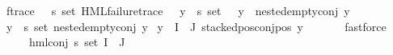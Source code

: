 \begin{isabellebody}
\ f{\isacharunderscore}{\kern0pt}trace{\isacharcolon}{\kern0pt}\ {\isachardoublequoteopen}{\isacharparenleft}{\kern0pt}{\isacharparenleft}{\kern0pt}{\isasymexists}{\isasympsi}{\isasymin}{\isacharparenleft}{\kern0pt}{\isasymPsi}\ {\isacharbackquote}{\kern0pt}\ {\isacharparenleft}{\kern0pt}{\isacharbraceleft}{\kern0pt}{\isacharbraceright}{\kern0pt}{\isacharcolon}{\kern0pt}{\isacharcolon}{\kern0pt}{\isacharprime}{\kern0pt}s\ set{\isacharparenright}{\kern0pt}{\isacharparenright}{\kern0pt}{\isachardot}{\kern0pt}\ HML{\isacharunderscore}{\kern0pt}failure{\isacharunderscore}{\kern0pt}trace\ {\isasympsi}\ {\isasymand}\ {\isacharparenleft}{\kern0pt}{\isasymforall}y{\isasymin}{\isacharparenleft}{\kern0pt}{\isasymPsi}\ {\isacharbackquote}{\kern0pt}\ {\isacharparenleft}{\kern0pt}{\isacharbraceleft}{\kern0pt}{\isacharbraceright}{\kern0pt}{\isacharcolon}{\kern0pt}{\isacharcolon}{\kern0pt}{\isacharprime}{\kern0pt}s\ set{\isacharparenright}{\kern0pt}{\isacharparenright}{\kern0pt}{\isachardot}{\kern0pt}\ {\isasympsi}\ {\isasymnoteq}\ y\ {\isasymlongrightarrow}\ nested{\isacharunderscore}{\kern0pt}empty{\isacharunderscore}{\kern0pt}conj\ y{\isacharparenright}{\kern0pt}{\isacharparenright}{\kern0pt}\ {\isasymor}\isanewline
\ {\isacharparenleft}{\kern0pt}{\isasymforall}y{\isasymin}{\isacharparenleft}{\kern0pt}{\isasymPsi}\ {\isacharbackquote}{\kern0pt}\ {\isacharparenleft}{\kern0pt}{\isacharbraceleft}{\kern0pt}{\isacharbraceright}{\kern0pt}{\isacharcolon}{\kern0pt}{\isacharcolon}{\kern0pt}{\isacharprime}{\kern0pt}s\ set{\isacharparenright}{\kern0pt}{\isacharparenright}{\kern0pt}{\isachardot}{\kern0pt}\ nested{\isacharunderscore}{\kern0pt}empty{\isacharunderscore}{\kern0pt}conj\ y{\isacharparenright}{\kern0pt}{\isacharparenright}{\kern0pt}\ {\isasymand}\isanewline
{\isacharparenleft}{\kern0pt}{\isasymforall}y{\isasymin}{\isacharparenleft}{\kern0pt}{\isasymPsi}\ {\isacharbackquote}{\kern0pt}\ {\isacharparenleft}{\kern0pt}I\ {\isasyminter}\ J{\isacharparenright}{\kern0pt}{\isacharparenright}{\kern0pt}{\isachardot}{\kern0pt}\ stacked{\isacharunderscore}{\kern0pt}pos{\isacharunderscore}{\kern0pt}conj{\isacharunderscore}{\kern0pt}pos\ y{\isacharparenright}{\kern0pt}{\isachardoublequoteclose}\ \isanewline
\ \ \ \ \isamarkupfalse%
\ fastforce\ \isanewline
\ \ \isamarkupfalse%
\ {\isasympsi}\ \ {\isachardoublequoteopen}{\isasympsi}\ {\isasymequiv}\ {\isacharparenleft}{\kern0pt}hml{\isacharunderscore}{\kern0pt}conj\ {\isacharparenleft}{\kern0pt}{\isacharbraceleft}{\kern0pt}{\isacharbraceright}{\kern0pt}{\isacharcolon}{\kern0pt}{\isacharcolon}{\kern0pt}{\isacharprime}{\kern0pt}s\ set{\isacharparenright}{\kern0pt}\ {\isacharparenleft}{\kern0pt}I\ {\isasyminter}\ J{\isacharparenright}{\kern0pt}\ {\isasymPsi}{\isacharparenright}{\kern0pt}{\isachardoublequoteclose}\isanewline

\end{isabellebody}
